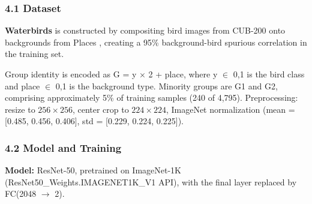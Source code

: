 
\subsubsection{4.1 Dataset}

\textbf{Waterbirds} \citep{Sagawa2019Distributionally} is constructed by compositing bird images from CUB-200 \citep{Welinder2010CUB} onto backgrounds from Places \citep{Zhou2018Places}, creating a 95\% background-bird spurious correlation in the training set.

\begin{table}[htbp]
\centering
{}
\end{table}

Group identity is encoded as G = y $\times$ 2 + place, where y $\in$ {0,1} is the bird class and place $\in$ {0,1} is the background type. Minority groups are G1 and G2, comprising approximately 5\% of training samples (240 of 4,795). Preprocessing: resize to $256\times 256$, center crop to $224\times 224$, ImageNet normalization (mean = [0.485, 0.456, 0.406], std = [0.229, 0.224, 0.225]).

\subsubsection{4.2 Model and Training}

\textbf{Model:} ResNet-50, pretrained on ImageNet-1K (ResNet50\_Weights.IMAGENET1K\_V1 API), with the final layer replaced by FC(2048 $\rightarrow$ 2).

\begin{table}[htbp]
\centering
{}
\end{table}


